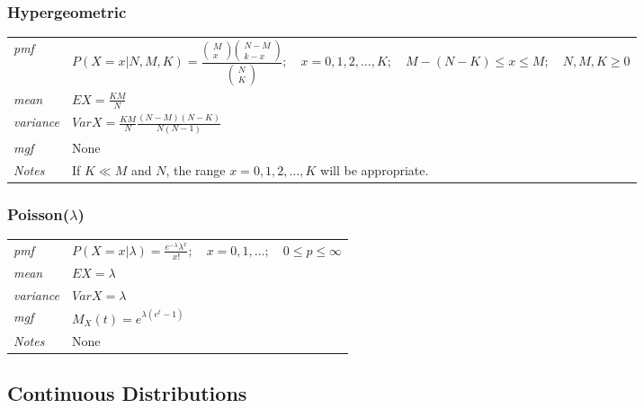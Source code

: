 \documentclass[12pt]{article}
\begin{document}
\subsubsection*{Hypergeometric \cite[p. 622]{StatisticalInference}}
\begin{tabularx}{\textwidth}{ l X }
\emph{pmf} & $P(X=x|N, M, K)=\frac{
\begin{pmatrix}
M \\
x
\end{pmatrix}
\begin{pmatrix}
N - M \\
k - x
\end{pmatrix}
}{
\begin{pmatrix}
N \\
K
\end{pmatrix}}; \quad x=0, 1, 2, \dots, K; \quad M - (N - K) \leq x \leq M; \quad N, M, K \geq 0$ \\
\emph{mean} & $EX=\frac{KM}{N}$ \\
\emph{variance} & $Var X = \frac{KM}{N} \frac{(N-M)(N-K)}{N(N-1)}$ \\
\emph{mgf} & None \\
\emph{Notes} & If $K \ll M$ and $N$, the range $x=0, 1, 2, \dots, K$ will be appropriate.\\
\end{tabularx}

\subsubsection*{Poisson($\lambda$) \cite[p. 622]{StatisticalInference}}
\begin{tabularx}{\textwidth}{ l X }
\emph{pmf} & $P(X=x|\lambda)=\frac{e^{-\lambda}\lambda^x}{x!}; \quad x=0, 1, \dots; \quad 0 \leq p \leq \infty$ \\
\emph{mean} & $EX=\lambda$ \\
\emph{variance} & $Var X =\lambda$ \\
\emph{mgf} & $M_X(t)=e^{\lambda(e^t-1)}$ \\
\emph{Notes} & None\\
\end{tabularx}

\subsection*{Continuous Distributions}
\end{document}
